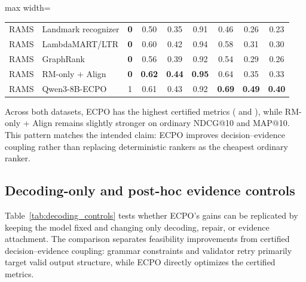 \documentclass{article}
\newcommand{\ECPO}{\textsc{ECPO}}
\begin{document}
\begin{table}[t]
\begin{adjustbox}{max width=\textwidth}
\begin{tabular}{l l c c c c c c c}
RAMS & Landmark recognizer & \textbf{0} & 0.50 & 0.35 & 0.91 & 0.46 & 0.26 & 0.23 \\
RAMS & LambdaMART/LTR & \textbf{0} & 0.60 & 0.42 & 0.94 & 0.58 & 0.31 & 0.30 \\
RAMS & GraphRank & \textbf{0} & 0.56 & 0.39 & 0.92 & 0.54 & 0.29 & 0.26 \\
RAMS & RM-only + Align & \textbf{0} & \textbf{0.62} & \textbf{0.44} & \textbf{0.95} & 0.64 & 0.35 & 0.33 \\
RAMS & Qwen3-8B-\ECPO & 1 & 0.61 & 0.43 & 0.92 & \textbf{0.69} & \textbf{0.49} & \textbf{0.40} \\
\bottomrule
\end{tabular}
\end{adjustbox}
\end{table}

Across both datasets, ECPO has the highest certified metrics ( and ), while RM-only + Align remains slightly stronger on ordinary NDCG@10 and MAP@10. This pattern matches the intended claim: ECPO improves decision--evidence coupling rather than replacing deterministic rankers as the cheapest ordinary ranker.

\subsection{Decoding-only and post-hoc evidence controls}
\label{sec:exp_decoding_controls}

Table~\ref{tab:decoding_controls} tests whether ECPO's gains can be replicated by keeping the model fixed and changing only decoding, repair, or evidence attachment. The comparison separates feasibility improvements from certified decision--evidence coupling: grammar constraints and validator retry primarily target valid output structure, while ECPO directly optimizes the certified metrics.
\end{document}
